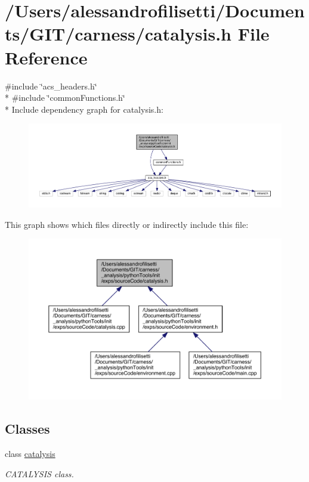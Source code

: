 \hypertarget{a00055}{\section{/\-Users/alessandrofilisetti/\-Documents/\-G\-I\-T/carness/catalysis.h File Reference}
\label{a00055}
}
{\ttfamily \#include \char`\"{}acs\-\_\-headers.\-h\char`\"{}}\\*
{\ttfamily \#include \char`\"{}common\-Functions.\-h\char`\"{}}\\*
Include dependency graph for catalysis.\-h\-:
\nopagebreak
\begin{figure}[H]
\begin{center}
\leavevmode
\includegraphics[width=350pt]{a00168}
\end{center}
\end{figure}
This graph shows which files directly or indirectly include this file\-:
\nopagebreak
\begin{figure}[H]
\begin{center}
\leavevmode
\includegraphics[width=350pt]{a00169}
\end{center}
\end{figure}
\subsection*{Classes}
\begin{DoxyCompactItemize}
\item 
class \hyperlink{a00012}{catalysis}
\begin{DoxyCompactList}\small\item\em C\-A\-T\-A\-L\-Y\-S\-I\-S class. \end{DoxyCompactList}\end{DoxyCompactItemize}
